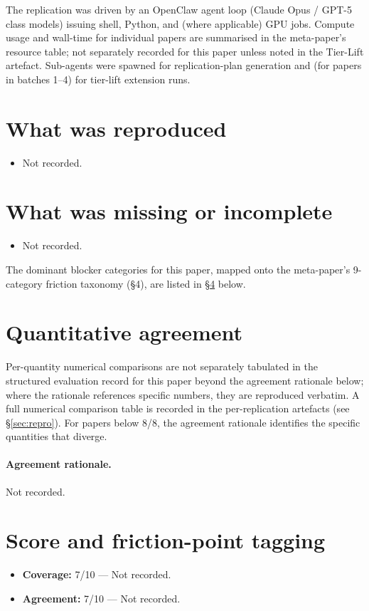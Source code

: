 \documentclass[11pt]{article}
\begin{document}
The replication was driven by an OpenClaw agent loop (Claude Opus / GPT-5 class models) issuing shell, Python, and (where applicable) GPU jobs. Compute usage and wall-time for individual papers are summarised in the meta-paper's resource table; not separately recorded for this paper unless noted in the Tier-Lift artefact. Sub-agents were spawned for replication-plan generation and (for papers in batches 1--4) for tier-lift extension runs.

\section{What was reproduced}
\begin{itemize}
\item Not recorded.
\end{itemize}

\section{What was missing or incomplete}
\begin{itemize}
\item Not recorded.
\end{itemize}
The dominant blocker categories for this paper, mapped onto the meta-paper's 9-category friction taxonomy (\S4), are listed in \S\ref{sec:friction} below.

\section{Quantitative agreement}
Per-quantity numerical comparisons are not separately tabulated in the structured evaluation record for this paper beyond the agreement rationale below; where the rationale references specific numbers, they are reproduced verbatim. A full numerical comparison table is recorded in the per-replication artefacts (see \S\ref{sec:repro}). For papers below 8/8, the agreement rationale identifies the specific quantities that diverge.

\paragraph{Agreement rationale.} Not recorded.

\section{Score and friction-point tagging}\label{sec:friction}
\begin{itemize}
\item \textbf{Coverage:} 7/10 --- Not recorded.
\item \textbf{Agreement:} 7/10 --- Not recorded.
\end{itemize}
\end{document}
